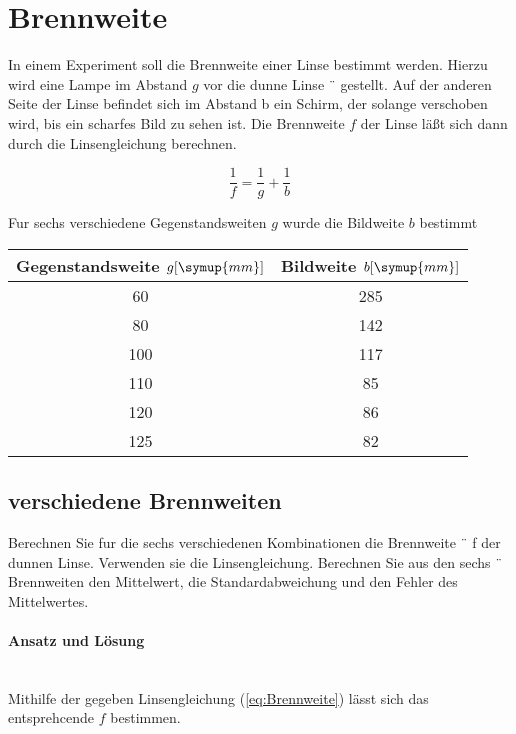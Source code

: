 \section{Brennweite}
In einem Experiment soll die Brennweite einer Linse bestimmt werden. Hierzu
wird eine Lampe im Abstand $g$ vor die dunne Linse ¨ gestellt. Auf der anderen
Seite der Linse befindet sich im Abstand b ein Schirm, der solange verschoben
wird, bis ein scharfes Bild zu sehen ist. Die Brennweite $f$ der Linse läßt sich dann
durch die Linsengleichung berechnen.

\begin{equation}
    \label{eq:Brennweite}
        \frac{1}{f}=\frac{1}{g} + \frac{1}{b}
\end{equation}


Fur sechs verschiedene Gegenstandsweiten $g$ wurde die Bildweite $b$ bestimmt

\begin{table}
\centering
\label{tab:lösunga}
\begin{tabular}{c c}
    Gegenstandsweite $g [\symup{mm}]$ & Bildweite $b [\symup{mm}]$\\
    \midrule
    60 &285 \\
    80 &142 \\
    100& 117\\
    110& 85 \\
    120& 86 \\
    125& 82 \\
    \bottomrule
\end{tabular}
\end{table}

\subsection{verschiedene Brennweiten}
 Berechnen Sie fur die sechs verschiedenen Kombinationen die Brennweite ¨ f der
dunnen Linse. Verwenden sie die Linsengleichung. Berechnen Sie aus den sechs ¨
Brennweiten den Mittelwert, die Standardabweichung und den Fehler des Mittelwertes.

\paragraph{Ansatz und Lösung} \mbox{} \\
Mithilfe der gegeben Linsengleichung (\ref{eq:Brennweite}) lässt sich das entsprehcende $f$ bestimmen.

